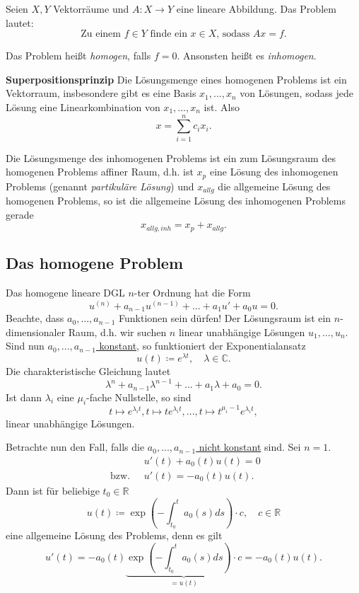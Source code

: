 \documentclass[a4paper]{book}
\theoremstyle{plain}
\theoremstyle{definition}
\newcommand{\R}{\mathbb R}
\newcommand{\vbreak}{\vspace{8mm}}
\begin{document}
Seien $X,Y$ Vektorräume und $A: X \to Y$ eine lineare Abbildung. Das Problem lautet:
 $$\text{Zu einem $f \in Y$ finde ein $x \in X$, sodass $Ax = f.$}$$
 
 Das Problem heißt \emph{homogen}, falls $f = 0$. Ansonsten heißt es \emph{inhomogen}.
\vbreak

\textbf{Superpositionsprinzip}
Die Lösungsmenge eines homogenen Problems ist ein Vektorraum, insbesondere gibt es eine Basis $x_1,...,x_n$ von Lösungen, sodass jede Lösung eine Linearkombination von $x_1,...,x_n$ ist. Also $$ x=\sum^n_{i=1}c_ix_i. $$

Die Lösungsmenge des inhomogenen Problems ist ein zum Lösungsraum des homogenen Problems affiner Raum, d.h. ist $x_p$ eine Lösung des inhomogenen Problems (genannt \emph{partikuläre Lösung}) und $x_{allg}$ die allgemeine Lösung des homogenen Problems, so ist die allgemeine Lösung des inhomogenen Problems gerade $$ x_{allg,inh} = x_p + x_{allg}. $$

\subsection{Das homogene Problem}
Das homogene lineare DGL $n$-ter Ordnung hat die Form
$$ u^{(n)} + a_{n-1}u^{(n-1)} + ... + a_1u' + a_0u = 0.$$
Beachte, dass $a_0, ..., a_{n-1}$ Funktionen sein dürfen!
Der Lösungsraum ist ein $n$-dimensionaler Raum, d.h. wir suchen $n$ linear unabhängige Lösungen $u_1,...,u_n$. Sind nun \underline{$a_0,...,a_{n-1}$ konstant}, so funktioniert der Exponentialansatz
$$ u(t) \coloneqq e^{\lambda t}, \quad \lambda \in \mathbb C. $$ 
Die charakteristische Gleichung lautet
$$ \lambda^n + a_{n-1}\lambda^{n-1} + ... + a_1\lambda + a_0 = 0. $$
Ist dann $\lambda_i$ eine $\mu_i$-fache Nullstelle, so sind
$$ t \mapsto e^{\lambda_it},  t \mapsto te^{\lambda_it}, ...,  t \mapsto t^{\mu_i-1}e^{\lambda_it}, $$
linear unabhängige Lösungen.

\vbreak

Betrachte nun den Fall, falls die \underline{$a_0,...,a_{n-1}$ nicht konstant} sind. Sei $n=1$.
\begin{align*}
	&u'(t) + a_0(t) u(t) = 0\\ 
	\text{ bzw. } \; &u'(t) = -a_0(t)u(t).
\end{align*}
Dann ist für beliebige $t_0 \in \R$ 
$$ u(t) \coloneqq \exp{\left(- \int^t_{t_0}a_0(s) ds\right)} \cdot c, \quad c \in \R $$
eine allgemeine Lösung des Problems, denn es gilt
\[
	u'(t) = -a_0(t) \underbrace{\exp{\left(- \int^t_{t_0}a_0(s) ds\right)} \cdot c}_{=u(t)} = -a_0(t)u(t).
\]	
\end{document}

